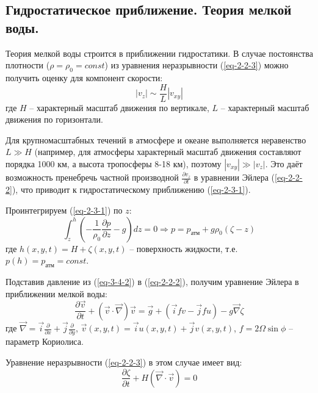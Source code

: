 \subsection{Гидростатическое приближение. Теория мелкой воды.}
Теория мелкой воды строится в приближении гидростатики.
В случае постоянства плотности ($\rho=\rho_0=const$) из уравнения неразрывности (\ref{eq-2-2-3}) можно получить оценку для компонент скорости:
\begin{equation}\label{eq-3-4-1}
\left|v_z\right|\sim\frac{H}{L}\left|v_{xy}\right|
\end{equation}
где $H$ -- характерный масштаб движения по вертикале, $L$ -- характерный масштаб движения по горизонтали.

Для крупномасштабных течений в атмосфере и океане выполняется неравенство $L\gg H$ (например, для атмосферы характерный масштаб движения составляют порядка 1000 км, а высота тропосферы 8-18 км), поэтому $|v_{xy}|\gg|v_z|$.
Это даёт возможность пренебречь частной производной $\frac{\partial v_{z}}{\partial t}$ в уравнении Эйлера (\ref{eq-2-2-2}), что приводит к гидростатическому приближению (\ref{eq-2-3-1}).

Проинтегрируем (\ref{eq-2-3-1}) по $z$:
\begin{equation}\label{eq-3-4-2}
\int_z^h\left(-\frac{1}{\rho_0}\frac{\partial p}{\partial z}-g\right)dz=0\Rightarrow p=p_\text{атм}+g\rho_0(\zeta-z)
\end{equation}
где $h(x, y, t)=H+\zeta(x, y, t)$ -- поверхность жидкости, т.е. $p(h)=p_\text{атм}=const$.

Подставив давление из (\ref{eq-3-4-2}) в (\ref{eq-2-2-2}), получим уравнение Эйлера в приближении мелкой воды:
\begin{equation}
\frac{\partial\vec{v}}{\partial t}+\left(\vec{v}\cdot\vec{\nabla}\right)\vec{v}=\vec{g}+(\vec{i}fv-\vec{j}fu)-g\vec{\nabla}\zeta
\end{equation}
где $\vec{\nabla}=\vec{i}\frac{\partial}{\partial x}+\vec{j}\frac{\partial}{\partial y}$, $\vec{v}(x, y, t)=\vec{i}u(x, y, t)+\vec{j}v(x, y, t)$, $f=2\Omega\sin{\phi}$ -- параметр Кориолиса.

Уравнение неразрывности (\ref{eq-2-2-3}) в этом случае имеет вид:
\begin{equation}
\frac{\partial \zeta}{\partial t}+H\left(\vec{\nabla}\cdot\vec{v}\right)=0
\end{equation}
